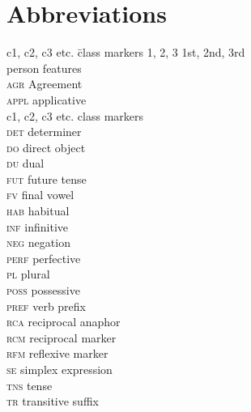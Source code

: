 \documentclass[output=paper]{langsci/langscibook}
\begin{document}
\section*{Abbreviations}
\begin{multicols}{2}\begin{tabbing}
c1, c2, c3 etc. \= class markers\kill
\textsc{1, 2, 3}  \>  1st, 2nd, 3rd \\ \> person features\\
\textsc{agr}  \>  Agreement\\
\textsc{appl}  \>  applicative\\
c1, c2, c3 etc. \> class markers\\
\textsc{det}  \>  determiner\\
\textsc{do} \>   direct object\\
\textsc{du} \>   dual\\
\textsc{fut}  \>  future tense\\
\textsc{fv}  \>  final vowel\\
\textsc{hab} \>   habitual\\
\textsc{inf}  \>  infinitive \\
\textsc{neg}  \>  negation\\
\textsc{perf}  \>  perfective\\
\textsc{pl}  \>  plural\\
\textsc{poss} \>   possessive\\
\textsc{pref}  \>  verb prefix\\
\textsc{rca}  \>  reciprocal anaphor\\
\textsc{rcm}  \>  reciprocal marker\\
\textsc{rfm}  \>  reflexive marker\\
\textsc{se} \>   simplex expression\\  
\textsc{tns} \>   tense\\
\textsc{tr}  \>  transitive suffix\\
\end{tabbing}\end{multicols}



\printbibliography[heading=subbibliography,notkeyword=this]
\end{document}
